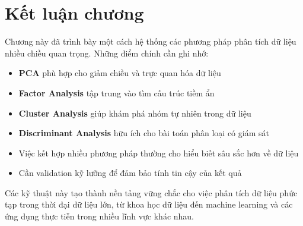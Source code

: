 \section{Kết luận chương}

Chương này đã trình bày một cách hệ thống các phương pháp phân tích dữ liệu nhiều chiều quan trọng. Những điểm chính cần ghi nhớ:

\begin{itemize}
    \item \textbf{PCA} phù hợp cho giảm chiều và trực quan hóa dữ liệu
    \item \textbf{Factor Analysis} tập trung vào tìm cấu trúc tiềm ẩn
    \item \textbf{Cluster Analysis} giúp khám phá nhóm tự nhiên trong dữ liệu
    \item \textbf{Discriminant Analysis} hữu ích cho bài toán phân loại có giám sát
    \item Việc kết hợp nhiều phương pháp thường cho hiểu biết sâu sắc hơn về dữ liệu
    \item Cần validation kỹ lưỡng để đảm bảo tính tin cậy của kết quả
\end{itemize}

Các kỹ thuật này tạo thành nền tảng vững chắc cho việc phân tích dữ liệu phức tạp trong thời đại dữ liệu lớn, từ khoa học dữ liệu đến machine learning và các ứng dụng thực tiễn trong nhiều lĩnh vực khác nhau.